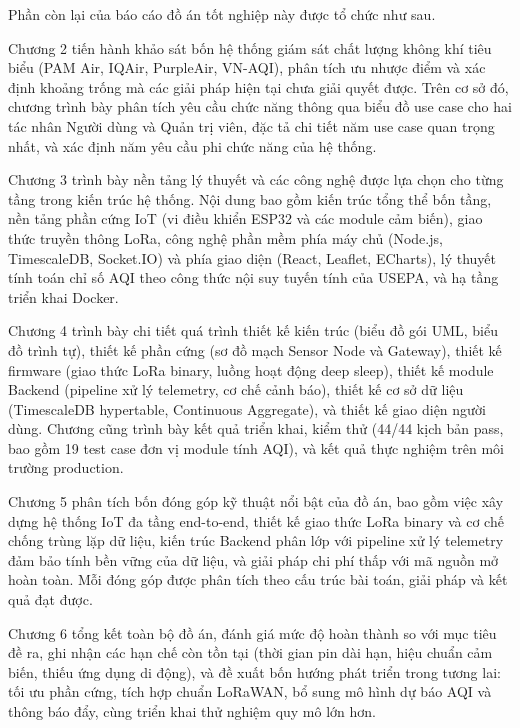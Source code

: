 \documentclass[../DoAn.tex]{subfiles}
\begin{document}
Phần còn lại của báo cáo đồ án tốt nghiệp này được tổ chức như sau.

Chương 2 tiến hành khảo sát bốn hệ thống giám sát chất lượng không khí tiêu biểu (PAM Air, IQAir, PurpleAir, VN-AQI), phân tích ưu nhược điểm và xác định khoảng trống mà các giải pháp hiện tại chưa giải quyết được. Trên cơ sở đó, chương trình bày phân tích yêu cầu chức năng thông qua biểu đồ use case cho hai tác nhân Người dùng và Quản trị viên, đặc tả chi tiết năm use case quan trọng nhất, và xác định năm yêu cầu phi chức năng của hệ thống.

Chương 3 trình bày nền tảng lý thuyết và các công nghệ được lựa chọn cho từng tầng trong kiến trúc hệ thống. Nội dung bao gồm kiến trúc tổng thể bốn tầng, nền tảng phần cứng \gls{IoT} (vi điều khiển ESP32 và các module cảm biến), giao thức truyền thông \gls{LoRa}, công nghệ phần mềm phía máy chủ (Node.js, TimescaleDB, Socket.IO) và phía giao diện (React, Leaflet, ECharts), lý thuyết tính toán chỉ số \gls{AQI} theo công thức nội suy tuyến tính của \gls{USEPA}, và hạ tầng triển khai Docker.

Chương 4 trình bày chi tiết quá trình thiết kế kiến trúc (biểu đồ gói UML, biểu đồ trình tự), thiết kế phần cứng (sơ đồ mạch Sensor Node và Gateway), thiết kế firmware (giao thức \gls{LoRa} binary, luồng hoạt động deep sleep), thiết kế module Backend (pipeline xử lý telemetry, cơ chế cảnh báo), thiết kế cơ sở dữ liệu (TimescaleDB hypertable, Continuous Aggregate), và thiết kế giao diện người dùng. Chương cũng trình bày kết quả triển khai, kiểm thử (44/44 kịch bản pass, bao gồm 19 test case đơn vị module tính \gls{AQI}), và kết quả thực nghiệm trên môi trường production.

Chương 5 phân tích bốn đóng góp kỹ thuật nổi bật của đồ án, bao gồm việc xây dựng hệ thống \gls{IoT} đa tầng end-to-end, thiết kế giao thức \gls{LoRa} binary và cơ chế chống trùng lặp dữ liệu, kiến trúc Backend phân lớp với pipeline xử lý telemetry đảm bảo tính bền vững của dữ liệu, và giải pháp chi phí thấp với mã nguồn mở hoàn toàn. Mỗi đóng góp được phân tích theo cấu trúc bài toán, giải pháp và kết quả đạt được.

Chương 6 tổng kết toàn bộ đồ án, đánh giá mức độ hoàn thành so với mục tiêu đề ra, ghi nhận các hạn chế còn tồn tại (thời gian pin dài hạn, hiệu chuẩn cảm biến, thiếu ứng dụng di động), và đề xuất bốn hướng phát triển trong tương lai: tối ưu phần cứng, tích hợp chuẩn LoRaWAN, bổ sung mô hình dự báo \gls{AQI} và thông báo đẩy, cùng triển khai thử nghiệm quy mô lớn hơn.
\end{document}
